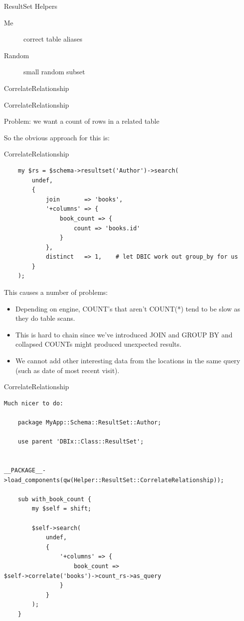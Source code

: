 \begin{frame}{ResultSet Helpers}
\begin{description}
\item[Me] correct table aliases
\item[Random] small random subset
\item[CorrelateRelationship]  
\end{description}
\end{frame}

\begin{frame}{CorrelateRelationship}

Problem: we want a count of rows in a related table

\end{frame}

So the obvious approach for this is:

\begin{frame}[fragile]{CorrelateRelationship}
\begin{lstlisting}
    my $rs = $schema->resultset('Author')->search(
        undef,
        {
            join       => 'books',
            '+columns' => {
                book_count => {
                    count => 'books.id'
                }
            },
            distinct   => 1,    # let DBIC work out group_by for us
        }
    );
\end{lstlisting}
\end{frame}
This causes a number of problems:

\begin{itemize}
\item Depending on engine, COUNT’s that aren’t COUNT(*) tend to be slow as
they do table scans.
\item This is hard to chain since we've introduced JOIN and GROUP BY and
collapsed COUNTs might produced unexpected results.
\item We cannot add other interesting data from the locations in the same query (such as date of most recent visit).
\end{itemize}

\begin{frame}[fragile]{CorrelateRelationship}
\begin{lstlisting}
Much nicer to do:

    package MyApp::Schema::ResultSet::Author;

    use parent 'DBIx::Class::ResultSet';

   
__PACKAGE__->load_components(qw(Helper::ResultSet::CorrelateRelationship));

    sub with_book_count {
        my $self = shift;

        $self->search(
            undef,
            {
                '+columns' => {
                    book_count =>
$self->correlate('books')->count_rs->as_query
                }
            }
        );
    }
\end{lstlisting}
\end{frame}

